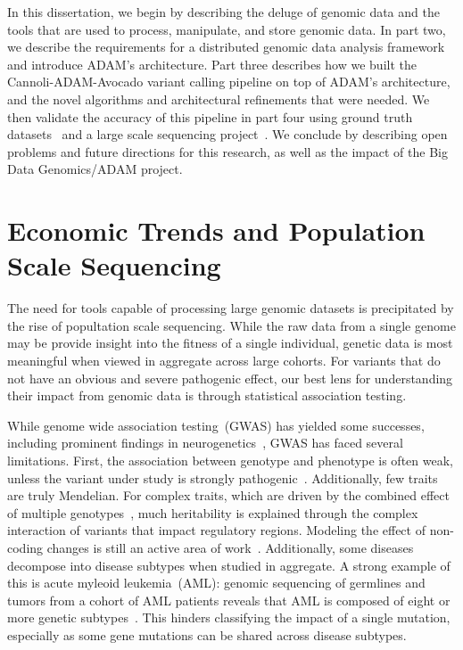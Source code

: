 \documentclass[phd]{ucbthesis}
\begin{document}
In this dissertation, we begin by describing the deluge of genomic data and the
tools that are used to process, manipulate, and store genomic data. In part two,
we describe the requirements for a distributed genomic data analysis
framework and introduce {ADAM}'s architecture. Part three describes how
we built the {Cannoli}-{ADAM}-{Avocado} variant calling
pipeline on top of {ADAM}'s architecture, and the novel algorithms and
architectural refinements that were needed. We then validate the accuracy of
this pipeline in part four using ground truth datasets~\cite{zook15} and a large
scale sequencing project~\cite{mallick16}. We conclude by describing open
problems and future directions for this research, as well as the impact of the
Big Data Genomics/{ADAM} project.

\section{Economic Trends and Population Scale Sequencing}
\label{sec:economic-trends-population-scale}

The need for tools capable of processing large genomic datasets is precipitated
by the rise of popultation scale sequencing. While the raw data from a single
genome may be provide insight into the fitness of a single individual, genetic
data is most meaningful when viewed in aggregate across large cohorts.
For variants that do not have an obvious and severe pathogenic effect, our best
lens for understanding their impact from genomic data is through statistical
association testing.

While genome wide association testing~(GWAS) has yielded
some successes, including prominent findings in neurogenetics~\cite{ripke14},
GWAS has faced several limitations. First, the association between genotype and
phenotype is often weak, unless the variant under study is strongly
pathogenic~\cite{shi16}. Additionally, few traits are truly Mendelian.
For complex traits, which are driven by the combined effect of multiple
genotypes~\cite{boyle17}, much heritability is explained through the complex
interaction of variants that impact regulatory regions. Modeling the effect of
non-coding changes is still an active area of work~\cite{weingarten14}.
Additionally, some diseases decompose into disease subtypes when studied in
aggregate. A strong example of this is acute myleoid leukemia~(AML): genomic
sequencing of germlines and tumors from a cohort of AML patients reveals
that AML is composed of eight or more genetic subtypes~\cite{aml13}. This
hinders classifying the impact of a single mutation, especially as some
gene mutations can be shared across disease subtypes.
\end{document}
